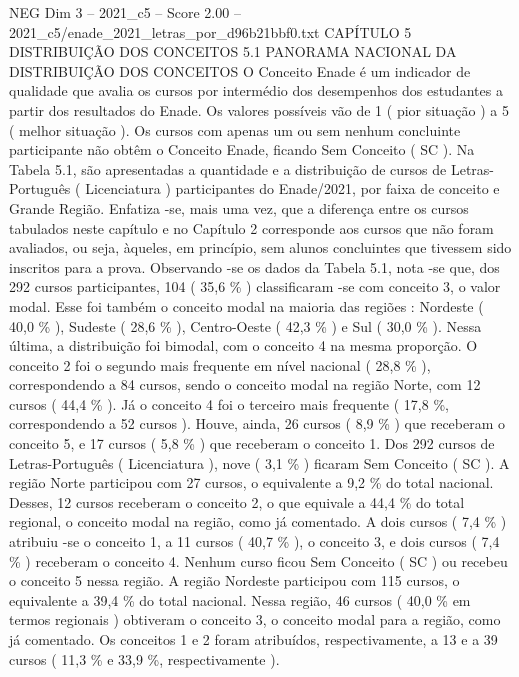 \begin{textsample}{NEG Dim 3 – 2021\_c5 – Score 2.00 – 2021\_c5/enade\_2021\_letras\_por\_d96b21bbf0.txt}  \label{ex:f3_neg_200}
CAPÍTULO 5 DISTRIBUIÇÃO DOS CONCEITOS 5.1 PANORAMA NACIONAL DA DISTRIBUIÇÃO DOS CONCEITOS O Conceito Enade é um indicador de qualidade que avalia os cursos por intermédio dos desempenhos dos estudantes a partir dos resultados do Enade.
Os valores possíveis vão de 1 ( pior situação ) a 5 ( melhor situação ).
Os cursos com apenas um ou sem nenhum concluinte participante não obtêm o Conceito Enade, ficando Sem Conceito ( SC ).
Na Tabela 5.1, são apresentadas a quantidade e a distribuição de cursos de Letras-Português ( Licenciatura ) participantes do Enade/2021, por faixa de conceito e Grande Região.
Enfatiza -se, mais uma vez, que a diferença entre os cursos tabulados neste capítulo e no Capítulo 2 corresponde aos cursos que não foram avaliados, ou seja, àqueles, em princípio, sem alunos concluintes que tivessem sido inscritos para a prova.
Observando -se os dados da Tabela 5.1, nota -se que, dos 292 cursos participantes, 104 ( 35,6 \% ) classificaram -se com conceito 3, o valor modal.
Esse foi também o conceito modal na maioria das regiões : Nordeste ( 40,0 \% ), Sudeste ( 28,6 \% ), Centro-Oeste ( 42,3 \% ) e Sul ( 30,0 \% ).
Nessa última, a distribuição foi bimodal, com o conceito 4 na mesma proporção.
O conceito 2 foi o segundo mais frequente em nível nacional ( 28,8 \% ), correspondendo a 84 cursos, sendo o conceito modal na região Norte, com 12 cursos ( 44,4 \% ).
Já o conceito 4 foi o terceiro mais frequente ( 17,8 \%, correspondendo a 52 cursos ).
Houve, ainda, 26 cursos ( 8,9 \% ) que receberam o conceito 5, e 17 cursos ( 5,8 \% ) que receberam o conceito 1.
Dos 292 cursos de Letras-Português ( Licenciatura ), nove ( 3,1 \% ) ficaram Sem Conceito ( SC ).
A região Norte participou com 27 cursos, o equivalente a 9,2 \% do total nacional.
Desses, 12 cursos receberam o conceito 2, o que equivale a 44,4 \% do total regional, o conceito modal na região, como já comentado.
A dois cursos ( 7,4 \% ) atribuiu -se o conceito 1, a 11 cursos ( 40,7 \% ), o conceito 3, e dois cursos ( 7,4 \% ) receberam o conceito 4.
Nenhum curso ficou Sem Conceito ( SC ) ou recebeu o conceito 5 nessa região.
A região Nordeste participou com 115 cursos, o equivalente a 39,4 \% do total nacional.
Nessa região, 46 cursos ( 40,0 \% em termos regionais ) obtiveram o conceito 3, o conceito modal para a região, como já comentado.
Os conceitos 1 e 2 foram atribuídos, respectivamente, a 13 e a 39 cursos ( 11,3 \% e 33,9 \%, respectivamente ).

\end{textsample}
